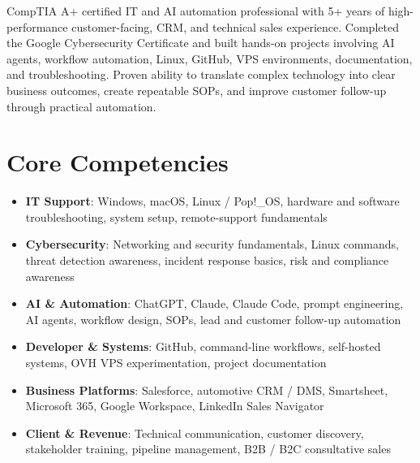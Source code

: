 \documentclass[11pt,a4paper,sans]{moderncv}
\begin{document}
\makecvtitle


\vspace{6pt}
\small{CompTIA A+ certified IT and AI automation professional with 5+ years of high-performance customer-facing, CRM, and technical sales experience. Completed the Google Cybersecurity Certificate and built hands-on projects involving AI agents, workflow automation, Linux, GitHub, VPS environments, documentation, and troubleshooting. Proven ability to translate complex technology into clear business outcomes, create repeatable SOPs, and improve customer follow-up through practical automation.}


\section{Core Competencies}
\vspace{1pt}
\begin{itemize}

\item \textbf{IT Support}: Windows, macOS, Linux / Pop!\_OS, hardware and software troubleshooting, system setup, remote-support fundamentals

\item \textbf{Cybersecurity}: Networking and security fundamentals, Linux commands, threat detection awareness, incident response basics, risk and compliance awareness

\item \textbf{AI \& Automation}: ChatGPT, Claude, Claude Code, prompt engineering, AI agents, workflow design, SOPs, lead and customer follow-up automation

\item \textbf{Developer \& Systems}: GitHub, command-line workflows, self-hosted systems, OVH VPS experimentation, project documentation

\item \textbf{Business Platforms}: Salesforce, automotive CRM / DMS, Smartsheet, Microsoft 365, Google Workspace, LinkedIn Sales Navigator

\item \textbf{Client \& Revenue}: Technical communication, customer discovery, stakeholder training, pipeline management, B2B / B2C consultative sales

\end{itemize}
\end{document}
